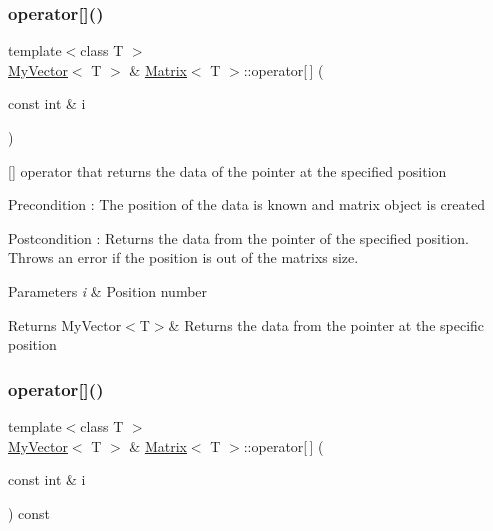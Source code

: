 \subsubsection{\texorpdfstring{operator[]()}{operator[]()}\hspace{0.1cm}{\footnotesize\ttfamily [1/2]}}
{\footnotesize\ttfamily template$<$class T $>$ \\
\mbox{\hyperlink{class_my_vector}{My\+Vector}}$<$ T $>$ \& \mbox{\hyperlink{class_matrix}{Matrix}}$<$ T $>$\+::operator\mbox{[}$\,$\mbox{]} (\begin{DoxyParamCaption}\item[{const int \&}]{i }\end{DoxyParamCaption})}



\mbox{[}\mbox{]} operator that returns the data of the pointer at the specified position 

\begin{DoxyPrecond}{Precondition}
\+: The position of the data is known and matrix object is created 
\end{DoxyPrecond}
\begin{DoxyPostcond}{Postcondition}
\+: Returns the data from the pointer of the specified position. Throws an error if the position is out of the matrix\textquotesingle{}s size. 
\end{DoxyPostcond}

\begin{DoxyParams}{Parameters}
{\em i} & Position number \\
\hline
\end{DoxyParams}
\begin{DoxyReturn}{Returns}
My\+Vector$<$\+T$>$\& Returns the data from the pointer at the specific position 
\end{DoxyReturn}
\mbox{\label{class_matrix_a56c7f18f272e74bee2b616eba702fc87}} 
\subsubsection{\texorpdfstring{operator[]()}{operator[]()}\hspace{0.1cm}{\footnotesize\ttfamily [2/2]}}
{\footnotesize\ttfamily template$<$class T $>$ \\
\mbox{\hyperlink{class_my_vector}{My\+Vector}}$<$ T $>$ \& \mbox{\hyperlink{class_matrix}{Matrix}}$<$ T $>$\+::operator\mbox{[}$\,$\mbox{]} (\begin{DoxyParamCaption}\item[{const int \&}]{i }\end{DoxyParamCaption}) const}



